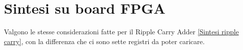 %

\section{Sintesi su board FPGA}

Valgono le stesse considerazioni fatte per il Ripple Carry Adder \ref{Sintesi ripple carry},
con la differenza che ci sono sette registri da poter caricare.%

